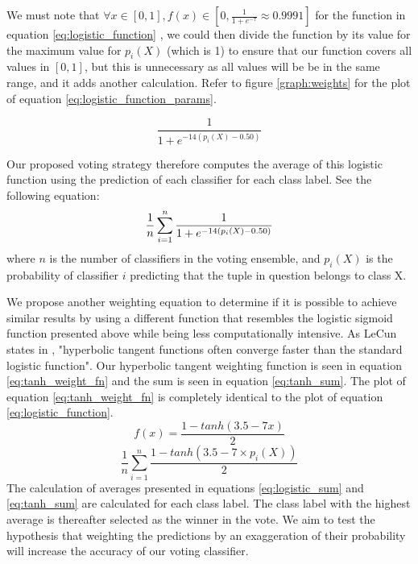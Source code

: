 We must note that $\forall x \in [0,1], f(x) \in [0, \frac{1}{1+e^{-7}}\approx 0.9991]$ for the function in equation \ref{eq:logistic_function} , we could then divide the function by its value for the maximum value for $p_i(X)$ (which is 1) to ensure that our function covers all values in $[0,1]$, but this is unnecessary as all values will be be in the same range, and it adds another calculation.
Refer to figure \ref{graph:weights} for the plot of equation \ref{eq:logistic_function_params}.

\begin{equation}
\frac{1}{1+e^{-14(p_i(X)-0.50)}}
\label{eq:logistic_function_params}
\end{equation}

Our proposed voting strategy therefore computes the average of this logistic function using the prediction of each classifier for each class label. See the following equation:
\begin{equation}
\frac{1}{n}\sum_{i=1}^{n}\frac{1}{1+e^{-14(p_i(X)-0.50)}}\\ 
    \label{eq:logistic_sum}
\end{equation}
where $n$ is the number of classifiers in the voting ensemble, and $p_i(X)$ is the probability of classifier $i$ predicting that the tuple in question belongs to class X.

We propose another weighting equation to determine if it is possible to achieve similar results by using a different function that resembles the logistic sigmoid function presented above while being less computationally intensive. As LeCun states in \citep[10]{lecun2012efficient},  "hyperbolic tangent functions often converge faster than the standard logistic function".
Our hyperbolic tangent weighting function is seen in equation \ref{eq:tanh_weight_fn} and the sum is seen in equation \ref{eq:tanh_sum}. The plot of equation \ref{eq:tanh_weight_fn} is completely identical to the plot of equation \ref{eq:logistic_function}.
\begin{equation}
    f(x)=\frac{1-tanh(3.5-7x)}{2}
    \label{eq:tanh_weight_fn}
\end{equation}
\begin{equation}
\frac{1}{n}\sum_{i=1}^{n} \frac{1-tanh(3.5-7\times p_i(X))}{2}
    \label{eq:tanh_sum}
\end{equation}
The calculation of averages presented in equations \ref{eq:logistic_sum} and \ref{eq:tanh_sum} are calculated for each class label. The class label with the highest average is thereafter selected as the winner in the vote. We aim to test the hypothesis that weighting the predictions by an exaggeration of their probability will increase the accuracy of our voting classifier.

